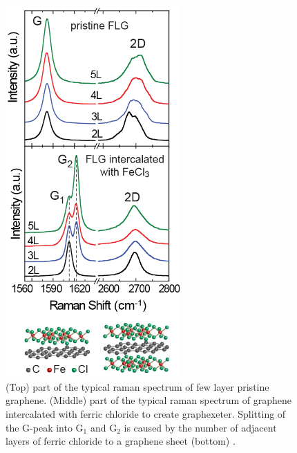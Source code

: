 \documentclass[12pt,titlepage]{article}
\begin{document}
	\begin{figure}
		\centering
		\begin{minipage}[b]{.45\linewidth}
			\centering
			\includegraphics[width=0.6\textwidth]{figures/raman.png}
			\caption[Typical raman spectra of graphene and graphexeter.]{(Top) part of the typical raman spectrum of few layer pristine graphene. (Middle) part of the typical raman spectrum of graphene intercalated with ferric chloride to create graphexeter. Splitting of the G-peak into $\text{G}_1$ and $\text{G}_2$ is caused by the number of adjacent layers of ferric chloride to a graphene sheet (bottom) \cite{Khrapach2012a}. }
			\label{fig:raman}
		\end{minipage}
		\begin{minipage}[b]{0.45\linewidth}
			\centering

\end{minipage}
\end{figure}
\end{document}
